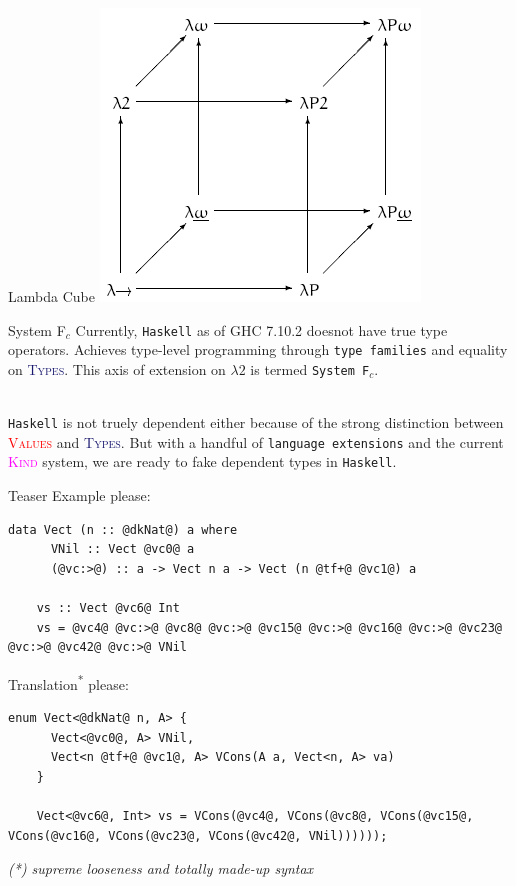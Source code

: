 \documentclass[xcolor={usenames,dvipsnames}]{beamer}
\newcommand{\htycon}[1]{\textcolor{MidnightBlue}{\textsc{#1}}}
\newcommand{\hvalcon}[1]{\textcolor{Red}{\textsc{#1}}}
\newcommand{\hkind}[1]{\textcolor{Fuchsia}{\textsc{#1}}}
\begin{document}
\begin{frame}[fragile]{Lambda Cube}
  \includegraphics[scale=0.6]{Lambda_cube.png}
\end{frame}

\begin{frame}[fragile]{System F$_c$}
  Currently, \texttt{Haskell} as of GHC 7.10.2 doesnot have true type operators. Achieves type-level programming through \texttt{type families} and equality on \htycon{Types}. This axis of extension on $\lambda2$ is termed \texttt{System F$_c$}.

  \ \\
  \pause
  \texttt{Haskell} is not truely dependent either because of the strong distinction between \hvalcon{Values} and \htycon{Types}. But with a handful of \texttt{language extensions} and the current \hkind{Kind} system, we are ready to fake dependent types in \texttt{Haskell}.
\end{frame}

\begin{frame}[fragile]{Teaser}
  Example please:
  \begin{lstlisting}[style=hask]
    data Vect (n :: @dkNat@) a where
      VNil :: Vect @vc0@ a
      (@vc:>@) :: a -> Vect n a -> Vect (n @tf+@ @vc1@) a

    vs :: Vect @vc6@ Int
    vs = @vc4@ @vc:>@ @vc8@ @vc:>@ @vc15@ @vc:>@ @vc16@ @vc:>@ @vc23@ @vc:>@ @vc42@ @vc:>@ VNil
  \end{lstlisting}

  \pause
  Translation\textsuperscript{*} please:
  \begin{lstlisting}[style=hask]
    enum Vect<@dkNat@ n, A> {
      Vect<@vc0@, A> VNil,
      Vect<n @tf+@ @vc1@, A> VCons(A a, Vect<n, A> va)
    }

    Vect<@vc6@, Int> vs = VCons(@vc4@, VCons(@vc8@, VCons(@vc15@, VCons(@vc16@, VCons(@vc23@, VCons(@vc42@, VNil))))));
  \end{lstlisting}
  \textit{\tiny{(*) supreme looseness and totally made-up syntax}}
\end{frame}
\end{document}
